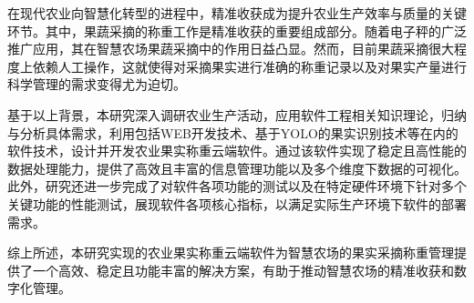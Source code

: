 在现代农业向智慧化转型的进程中，精准收获成为提升农业生产效率与质量的关键环节。其中，果蔬采摘的称重工作是精准收获的重要组成部分。随着电子秤的广泛推广应用，其在智慧农场果蔬采摘中的作用日益凸显。然而，目前果蔬采摘很大程度上依赖人工操作，这就使得对采摘果实进行准确的称重记录以及对果实产量进行科学管理的需求变得尤为迫切。

基于以上背景，本研究深入调研农业生产活动，应用软件工程相关知识理论，归纳与分析具体需求，利用包括WEB开发技术、基于YOLO的果实识别技术等在内的软件技术，设计并开发农业果实称重云端软件。通过该软件实现了稳定且高性能的数据处理能力，提供了高效且丰富的信息管理功能以及多个维度下数据的可视化。此外，研究还进一步完成了对软件各项功能的测试以及在特定硬件环境下针对多个关键功能的性能测试，展现软件各项核心指标，以满足实际生产环境下软件的部署需求。

综上所述，本研究实现的农业果实称重云端软件为智慧农场的果实采摘称重管理提供了一个高效、稳定且功能丰富的解决方案，有助于推动智慧农场的精准收获和数字化管理。 